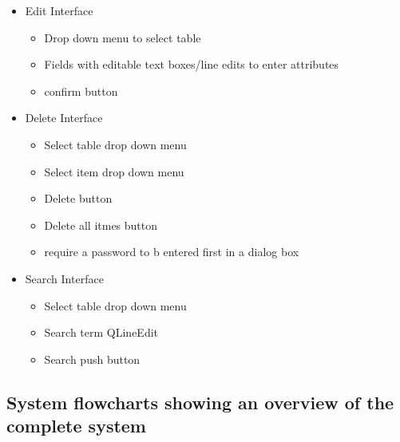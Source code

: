 \begin {itemize}
\begin {itemize}
\begin {itemize}
	\begin {itemize}
		\item Drop down menu to select table
		\item Fields with editable text boxes/line edits to enter attributes
		\item confirm button
	\end {itemize}
	\item Edit Interface
    \begin {itemize}
		\item Drop down menu to select table
		\item Fields with editable text boxes/line edits to enter attributes
		\item confirm button
	\end {itemize}
	\item Delete Interface
	\begin {itemize}
		\item Select table drop down menu
		\item Select item drop down menu
		\item Delete button
		\item Delete all itmes button
		\item require a password to b entered first in a dialog box
	\end {itemize}
	\item Search Interface
	\begin {itemize}
		\item Select table drop down menu
		\item Search term QLineEdit
		\item Search push button
	\end {itemize}	
	\end {itemize}
	\end {itemize}
\end {itemize}

\subsection{System flowcharts showing an overview of the complete system}


